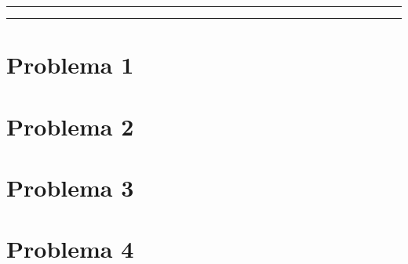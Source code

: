 








\tableofcontents			%

\begin{center}
	\rule[0mm]{150mm}{0.1mm}		%
	\end{center}
	
	
\begin{abstract}		%
  
\end{abstract}
	
\begin{center}
	\rule[0mm]{150mm}{0.1mm}
	\end{center}

\section{Problema 1}	
            
                            
\section{Problema 2}	
      
    
\section{Problema 3}	
         
    
\section{Problema 4}	
            

